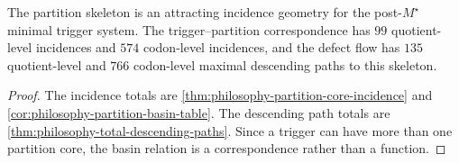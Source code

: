 \begin{theorem}
\label{thm:philosophy-partition-basin-theorem}
The partition skeleton is an attracting incidence geometry for the
post-$M^{\star}$ minimal trigger system. The trigger--partition
correspondence has $99$ quotient-level incidences and $574$ codon-level
incidences, and the defect flow has $135$ quotient-level and $766$
codon-level maximal descending paths to this skeleton.
\end{theorem}
\begin{proof}
The incidence totals are
\autoref{thm:philosophy-partition-core-incidence} and
\autoref{cor:philosophy-partition-basin-table}. The descending path
totals are \autoref{thm:philosophy-total-descending-paths}. Since a
trigger can have more than one partition core, the basin relation is a
correspondence rather than a function.
\end{proof}

